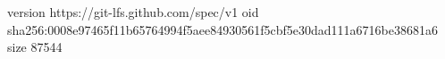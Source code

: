 version https://git-lfs.github.com/spec/v1
oid sha256:0008e97465f11b65764994f5aee84930561f5cbf5e30dad111a6716be38681a6
size 87544

